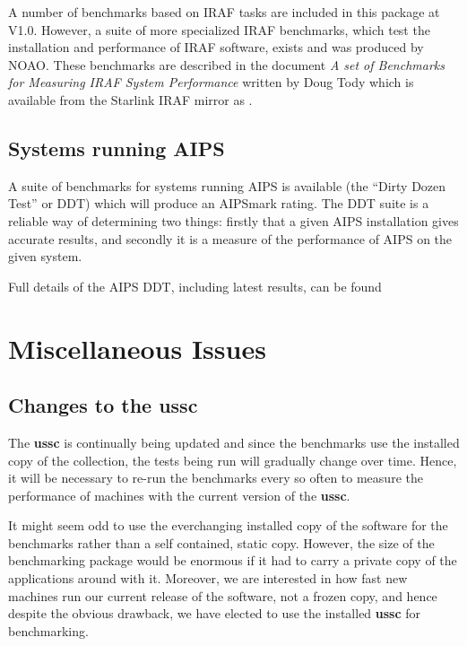 A number of benchmarks based on IRAF tasks are included in this package
at V1.0. However, a suite of more specialized IRAF benchmarks, which
test the installation and performance of IRAF software, exists and was
produced by NOAO. These benchmarks are described in the document {\em A
set of Benchmarks for Measuring IRAF System Performance} written by
Doug Tody which is available from the Starlink IRAF mirror as
.


\subsection{Systems running AIPS}

A suite of benchmarks for systems running AIPS is available (the
``Dirty Dozen Test'' or DDT) which will produce an AIPSmark rating.
The DDT suite is a reliable way of determining two things:  firstly
that a given AIPS installation gives accurate results, and secondly it
is a measure of the performance of AIPS on the given system.

Full details of the AIPS DDT, including latest results, can be found

\section{Miscellaneous Issues}

\subsection{Changes to the ussc}
\label{ussc-changes}

The {\bf ussc} is continually being updated and since the benchmarks use the
installed copy of the collection, the tests being run will gradually
change over time. Hence, it will be necessary to re-run the benchmarks
every so often to measure the performance of machines with the current
version of the {\bf ussc}.


It might seem odd to use the everchanging installed copy of the
software for the benchmarks rather than a self contained, static copy.
However, the size of the benchmarking package would be enormous if
it had to carry a private copy of the applications around with it.
Moreover, we are interested in how fast new machines run our current
release of the software, not a frozen copy, and hence despite the
obvious drawback, we have elected to use the installed {\bf ussc} for
benchmarking.

